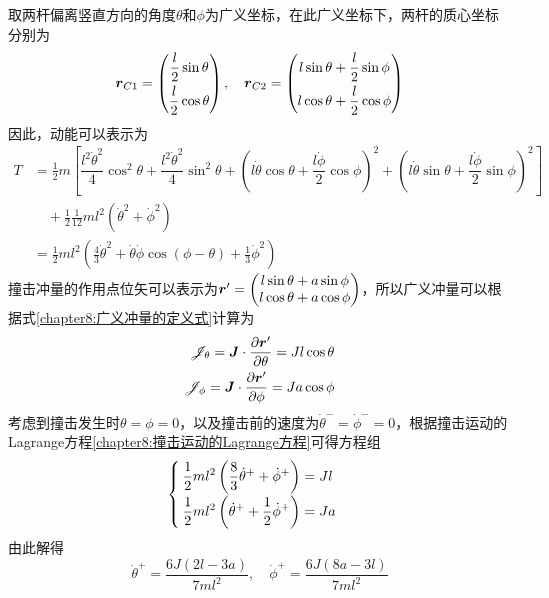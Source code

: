 \begin{solution}
取两杆偏离竖直方向的角度$\theta$和$\phi$为广义坐标，在此广义坐标下，两杆的质心坐标分别为
\begin{equation*}
	\boldsymbol{r}_{C1} = \begin{pmatrix} \dfrac l2\sin\theta \\[1.5ex] \dfrac l2\cos\theta \end{pmatrix},\quad \boldsymbol{r}_{C2} = \begin{pmatrix} l\sin\theta + \dfrac l2\sin\phi \\[1.5ex] l\cos\theta + \dfrac l2\cos\phi \end{pmatrix}
\end{equation*}
因此，动能可以表示为
\begin{align*}
	T & = \frac12 m\left[\dfrac{l^2\dot{\theta}^2}{4}\cos^2\theta+ \dfrac{l^2\dot{\theta}^2}{4}\sin^2\theta + \left(l\dot{\theta}\cos\theta + \dfrac{l\dot{\phi}}{2}\cos\phi\right)^2 + \left(l\dot{\theta}\sin\theta + \dfrac{l\dot{\phi}}{2}\sin\phi\right)^2\right] \\
	& \quad {} + \frac12 \frac{1}{12}ml^2\left(\dot{\theta}^2 + \dot{\phi}^2\right) \\
	& = \frac12 ml^2 \left(\frac43\dot{\theta}^2 + \dot{\theta}\dot{\phi}\cos(\phi-\theta)+ \frac13\dot{\phi}^2\right)
\end{align*}
撞击冲量的作用点位矢可以表示为$\boldsymbol{r}' = \begin{pmatrix} l\sin\theta+a\sin\phi \\ l\cos\theta+a\cos\phi \end{pmatrix}$，所以广义冲量可以根据式\eqref{chapter8:广义冲量的定义式}计算为
\begin{align*}
	\mathscr{J}_\theta = \boldsymbol{J} \cdot \frac{\partial \boldsymbol{r}'}{\partial \theta} = Jl\cos\theta \\
	\mathscr{J}_\phi = \boldsymbol{J} \cdot \frac{\partial \boldsymbol{r}'}{\partial \phi} = Ja\cos\phi
\end{align*}
考虑到撞击发生时$\theta=\phi=0$，以及撞击前的速度为$\dot{\theta}^-=\dot{\phi}^-=0$，根据撞击运动的Lagrange方程\eqref{chapter8:撞击运动的Lagrange方程}可得方程组
\begin{equation*}
\begin{cases}
	\displaystyle \frac12 ml^2 \left(\frac83\dot{\theta}^++\dot{\phi}^+\right) = Jl \\[1.5ex]
	\displaystyle \frac12 ml^2 \left(\dot{\theta}^++\frac12\dot{\phi}^+\right) = Ja
\end{cases}
\end{equation*}
由此解得
\begin{equation*}
	\dot{\theta}^+ = \frac{6J(2l-3a)}{7ml^2},\quad \dot{\phi}^+ = \frac{6J(8a-3l)}{7ml^2}
\end{equation*}
\end{solution}

